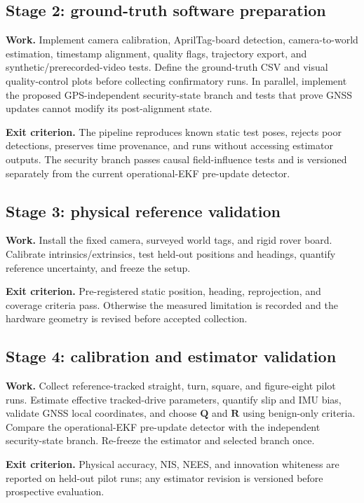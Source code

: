 \documentclass[11pt,a4paper]{article}
\begin{document}
\subsection{Stage 2: ground-truth software preparation}

\textbf{Work.} Implement camera calibration, AprilTag-board detection,
camera-to-world estimation, timestamp alignment, quality flags, trajectory
export, and synthetic/prerecorded-video tests. Define the ground-truth CSV and
visual quality-control plots before collecting confirmatory runs. In parallel,
implement the proposed GPS-independent security-state branch and tests that
prove GNSS updates cannot modify its post-alignment state.

\textbf{Exit criterion.} The pipeline reproduces known static test poses,
rejects poor detections, preserves time provenance, and runs without accessing
estimator outputs. The security branch passes causal field-influence tests and
is versioned separately from the current operational-EKF pre-update detector.

\subsection{Stage 3: physical reference validation}

\textbf{Work.} Install the fixed camera, surveyed world tags, and rigid rover
board. Calibrate intrinsics/extrinsics, test held-out positions and headings,
quantify reference uncertainty, and freeze the setup.

\textbf{Exit criterion.} Pre-registered static position, heading, reprojection,
and coverage criteria pass. Otherwise the measured limitation is recorded and
the hardware geometry is revised before accepted collection.

\subsection{Stage 4: calibration and estimator validation}

\textbf{Work.} Collect reference-tracked straight, turn, square, and
figure-eight pilot runs. Estimate effective tracked-drive parameters, quantify
slip and IMU bias, validate GNSS local coordinates, and choose $\mathbf Q$ and
$\mathbf R$ using benign-only criteria. Compare the operational-EKF pre-update
detector with the independent security-state branch. Re-freeze the estimator
and selected branch once.

\textbf{Exit criterion.} Physical accuracy, NIS, NEES, and innovation whiteness
are reported on held-out pilot runs; any estimator revision is versioned before
prospective evaluation.
\end{document}
